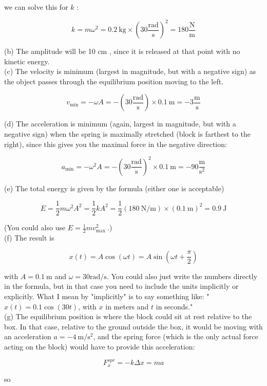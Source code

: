 \documentclass[10pt]{article}
\begin{document}
we can solve this for $k$ :

$$
k=m \omega^{2}=0.2 \mathrm{~kg} \times\left(30 \frac{\mathrm{rad}}{\mathrm{s}}\right)^{2}=180 \frac{\mathrm{N}}{\mathrm{m}}
$$

(b) The amplitude will be 10 cm , since it is released at that point with no kinetic energy.\\
(c) The velocity is minimum (largest in magnitude, but with a negative sign) as the object passes through the equilibrium position moving to the left.

$$
v_{\min }=-\omega A=-\left(30 \frac{\mathrm{rad}}{\mathrm{s}}\right) \times 0.1 \mathrm{~m}=-3 \frac{\mathrm{m}}{\mathrm{s}}
$$

(d) The acceleration is minimum (again, largest in magnitude, but with a negative sign) when the spring is maximally stretched (block is farthest to the right), since this gives you the maximal force in the negative direction:

$$
a_{\min }=-\omega^{2} A=-\left(30 \frac{\mathrm{rad}}{\mathrm{s}}\right)^{2} \times 0.1 \mathrm{~m}=-90 \frac{\mathrm{m}}{\mathrm{s}^{2}}
$$

(e) The total energy is given by the formula (either one is acceptable)

$$
E=\frac{1}{2} m \omega^{2} A^{2}=\frac{1}{2} k A^{2}=\frac{1}{2}(180 \mathrm{~N} / \mathrm{m}) \times(0.1 \mathrm{~m})^{2}=0.9 \mathrm{~J}
$$

(You could also use $E=\frac{1}{2} m v_{\text {max }}^{2}$.)\\
(f) The result is

$$
x(t)=A \cos (\omega t)=A \sin \left(\omega t+\frac{\pi}{2}\right)
$$

with $A=0.1 \mathrm{~m}$ and $\omega=30 \mathrm{rad} / \mathrm{s}$. You could also just write the numbers directly in the formula, but in that case you need to include the units implicitly or explicitly. What I mean by "implicitly" is to say something like: " $x(t)=0.1 \cos (30 t)$, with $x$ in meters and $t$ in seconds."\\
(g) The equilibrium position is where the block could sit at rest relative to the box. In that case, relative to the ground outside the box, it would be moving with an acceleration $a=-4 \mathrm{~m} / \mathrm{s}^{2}$, and the spring force (which is the only actual force acting on the block) would have to provide this acceleration:

$$
F_{x}^{s p r}=-k \Delta x=m a
$$

so
\end{document}
